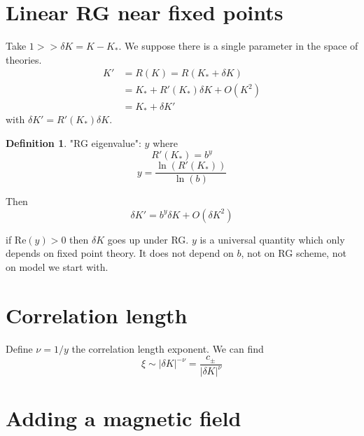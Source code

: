 \documentclass[a4paper]{book}
\theoremstyle{definition}
\newtheorem{definition}{Definition}[section]
\theoremstyle{remark}
\begin{document}
\section{Linear RG near fixed points}
Take $1 >> \delta K = K - K_*$. We suppose there is a single parameter in the space of theories. 
\begin{equation}
    \begin{aligned}
        K' &= R(K) = R(K_* + \delta K) \\
        &= K_* + R'(K_*)\delta K + O(K^2) \\
        &= K_* + \delta K'
    \end{aligned}
\end{equation}
with $\delta K' = R'(K_*)\delta K$. 

\begin{definition}
    "RG eigenvalue": $y$ where
    \begin{equation}
        R'(K_*) = b^y
    \end{equation}
    \begin{equation}
        y = \frac{\ln(R'(K_*))}{\ln(b)}
    \end{equation}
\end{definition}

Then 
\begin{equation}
    \delta K' = b^y \delta K + O(\delta K^2)
\end{equation}

if $\text{Re}(y)>0$ then $\delta K$ goes up under RG. $y$ is a universal quantity which only depends on fixed point theory. It does not depend on $b$, not on RG scheme, not on model we start with. 

\section{Correlation length}
Define $\nu = 1/y$ the correlation length exponent. We can find 
\begin{equation}
    \xi \sim |\delta K |^{-\nu} = \frac{c_\pm}{|\delta K |^{\nu}}
\end{equation}

\section{Adding a magnetic field}
\end{document}
